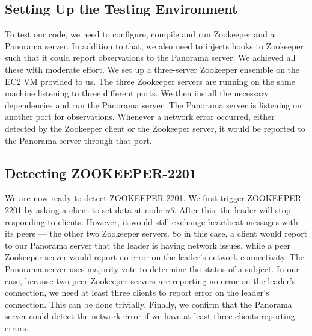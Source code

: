 \subsection{Setting Up the Testing Environment}
\label{ssec:ste}
To test our code, we need to configure, compile and run Zookeeper and a Panorama server. In addition to that, we also need to injects hooks to Zookeeper such that it could report observations to the Panorama server. We achieved all these with moderate effort. We set up a three-server Zookeeper ensemble on the EC2 VM provided to us. The three Zookeeper servers are running on the same machine listening to three different ports. We then install the necessary dependencies and run the Panorama server. The Panorama server is listening on another port for observations. Whenever a network error occurred, either detected by the Zookeeper client or the Zookeeper server, it would be reported to the Panorama server through that port. 

\subsection{Detecting ZOOKEEPER-2201}
We are now ready to detect ZOOKEEPER-2201. We first trigger ZOOKEEPER-2201 by asking a client to set data at node \textit{n3}. After this, the leader will stop responding to clients. However, it would still exchange heartbeat messages with its peers --- the other two Zookeeper servers. So in this case,
a client would report to our Panorama server that the leader is having network issues, while a peer Zookeeper server would report no error on the leader's network connectivity. The Panorama server uses majority vote to determine the status of a subject. In our case, because two peer Zookeeper servers are reporting no error on the leader's connection, we need at least three clients to report error on the leader's connection. This can be done trivially. Finally, we confirm that the Panorama server could detect the network error if we have at least three clients reporting errors.




